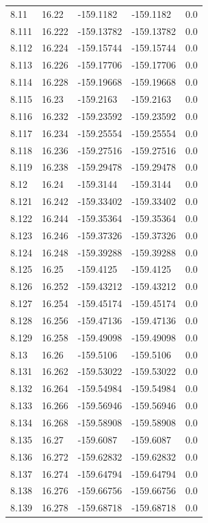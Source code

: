 \begin{tabular}{lllll}
8.11 & 16.22 & -159.1182 & -159.1182 & 0.0 \\
8.111 & 16.222 & -159.13782 & -159.13782 & 0.0 \\
8.112 & 16.224 & -159.15744 & -159.15744 & 0.0 \\
8.113 & 16.226 & -159.17706 & -159.17706 & 0.0 \\
8.114 & 16.228 & -159.19668 & -159.19668 & 0.0 \\
8.115 & 16.23 & -159.2163 & -159.2163 & 0.0 \\
8.116 & 16.232 & -159.23592 & -159.23592 & 0.0 \\
8.117 & 16.234 & -159.25554 & -159.25554 & 0.0 \\
8.118 & 16.236 & -159.27516 & -159.27516 & 0.0 \\
8.119 & 16.238 & -159.29478 & -159.29478 & 0.0 \\
8.12 & 16.24 & -159.3144 & -159.3144 & 0.0 \\
8.121 & 16.242 & -159.33402 & -159.33402 & 0.0 \\
8.122 & 16.244 & -159.35364 & -159.35364 & 0.0 \\
8.123 & 16.246 & -159.37326 & -159.37326 & 0.0 \\
8.124 & 16.248 & -159.39288 & -159.39288 & 0.0 \\
8.125 & 16.25 & -159.4125 & -159.4125 & 0.0 \\
8.126 & 16.252 & -159.43212 & -159.43212 & 0.0 \\
8.127 & 16.254 & -159.45174 & -159.45174 & 0.0 \\
8.128 & 16.256 & -159.47136 & -159.47136 & 0.0 \\
8.129 & 16.258 & -159.49098 & -159.49098 & 0.0 \\
8.13 & 16.26 & -159.5106 & -159.5106 & 0.0 \\
8.131 & 16.262 & -159.53022 & -159.53022 & 0.0 \\
8.132 & 16.264 & -159.54984 & -159.54984 & 0.0 \\
8.133 & 16.266 & -159.56946 & -159.56946 & 0.0 \\
8.134 & 16.268 & -159.58908 & -159.58908 & 0.0 \\
8.135 & 16.27 & -159.6087 & -159.6087 & 0.0 \\
8.136 & 16.272 & -159.62832 & -159.62832 & 0.0 \\
8.137 & 16.274 & -159.64794 & -159.64794 & 0.0 \\
8.138 & 16.276 & -159.66756 & -159.66756 & 0.0 \\
8.139 & 16.278 & -159.68718 & -159.68718 & 0.0 \\

\end{tabular}
